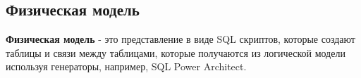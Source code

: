 \subsection{Физическая модель}

\textbf{Физическая модель} - это представление в виде SQL скриптов, которые создают таблицы и связи между таблицами,
которые получаются из логической модели используя генераторы, например, SQL Power Architect.







